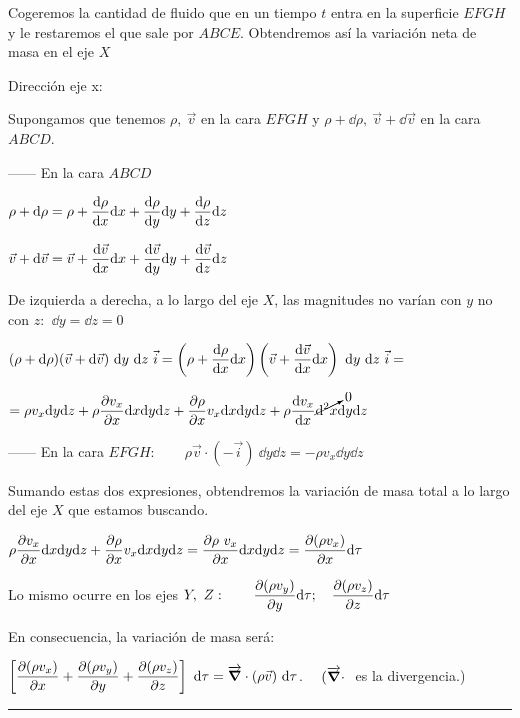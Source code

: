 Cogeremos la cantidad de fluido que en un tiempo $t$ entra en la superficie $EFGH$ y le restaremos el que sale por $ABCE$. Obtendremos así la variación neta de masa en el eje $X$



Dirección eje x: 

Supongamos que tenemos $\rho, \ \vec v$ en la cara $EFGH$ y $\rho+\dd \rho,\ \vec v+\dd \vec v$ en la cara $ABCD$.

------ En la cara $ABCD$

$\displaystyle \rho + \dd \rho=\rho +\dv{\rho}{x}\dd x+\dv{\rho}{y}\dd y+\dv{\rho}{z}\dd z$

$\displaystyle \vec v + \dd \vec v= \vec v + \dv{\vec v}{x}\dd x+\dv{\vec v}{y}\dd y+\dv{\vec v}{z}\dd z$

De izquierda a derecha, a lo largo del eje $X$, las magnitudes no varían con $y$ no con $z$: $\ \dd y=\dd z=0$

$\displaystyle (\rho+\dd \rho) (\vec v+\dd \vec v)\ \dd y \ \dd z \ \vec i=
\left(\rho+\dv{\rho}{x} \dd x \right) \left(\vec v+\dv{\vec v}{x}\dd x \right)\ \dd y \ \dd z \ \vec i=$

$=\displaystyle \rho v_x \dd y \dd z+\rho \pdv{v_x}{x} \dd x \dd y \dd z + \pdv{\rho}{x}v_x \dd x \dd y \dd z + \rho \dv{v_x}{x} \cancelto{0}{\dd^2 x} \dd y \dd z $

------ En la cara $EFGH: \qquad \rho \vec v \cdot (-\vec i) \ \dd y \dd z=-\rho v_x \dd y \dd z$

Sumando estas dos expresiones, obtendremos la variación de masa total a lo largo del eje $X$ que estamos buscando.

$\displaystyle \rho \pdv{v_x}{x} \dd x \dd y \dd z + \pdv{\rho}{x}v_x \dd x \dd y \dd z  =\pdv{\rho\ v_x}{x} \dd x \dd y \dd z=\pdv{(\rho v_x)}{x} \dd \tau$

Lo mismo ocurre en los ejes $\displaystyle Y,\ Z:\qquad \pdv{(\rho v_y)}{y} \dd \tau; \quad \pdv{(\rho v_z)}{z} \dd \tau$

En consecuencia, la variación de masa será:

$\displaystyle \left[ \pdv{(\rho v_x)}{x} +\pdv{(\rho v_y)}{y}+\pdv{(\rho v_z)}{z} \right] \ \dd \tau = \overrightarrow{\grad} \cdot (\rho \vec v) \ \dd \tau$. \textcolor{gris}{\small{$\quad (\overrightarrow{\grad}\cdot\ $} es la divergencia\normalsize{.})}

\vspace{5mm} %
\rule{5cm}{0.2pt}

